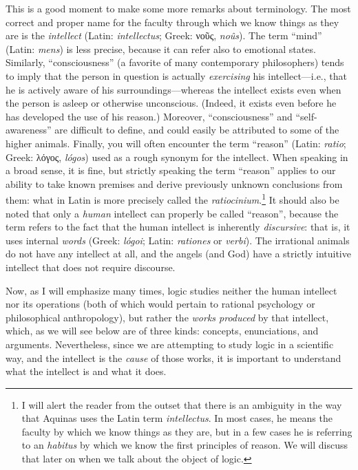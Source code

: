\documentclass[article,12pt,a4paper,oneside]{memoir}
\begin{document}
    This is a good moment to make some more remarks about terminology.
    The most correct and proper name for the faculty through which we
    know things as they are is the \emph{intellect} (Latin:
    \emph{intellectus}; Greek: νοῦς, \emph{noûs}). The term ``mind''
    (Latin: \emph{mens}) is less precise, because it can refer also to
    emotional states. Similarly, ``consciousness'' (a favorite of many
    contemporary philosophers) tends to imply that the person in
    question is actually \emph{exercising} his intellect---i.e., that he
    is actively aware of his surroundings---whereas the intellect exists
    even when the person is asleep or otherwise unconscious. (Indeed, it
    exists even before he has developed the use of his reason.)
    Moreover, ``consciousness'' and ``self-awareness'' are difficult to
    define, and could easily be attributed to some of the higher
    animals. Finally, you will often encounter the term ``reason''
    (Latin: \emph{ratio}; Greek: λόγος, \emph{lógos}) used as a rough
    synonym for the intellect. When speaking in a broad sense, it is
    fine, but strictly speaking the term ``reason'' applies to our
    ability to take known premises and derive previously unknown
    conclusions from them: what in Latin is more precisely called the
    \emph{ratiocinium}.\footnote{I will alert the reader from the outset
      that there is an ambiguity in the way that Aquinas uses the Latin
      term \emph{intellectus}. In most cases, he means the faculty by
      which we know things as they are, but in a few cases he is
      referring to an \emph{habitus} by which we know the first
      principles of reason. We will discuss that later on when we talk
      about the object of logic.} It should also be noted that only a
    \emph{human} intellect can properly be called ``reason'', because
    the term refers to the fact that the human intellect is inherently
    \emph{discursive}: that is, it uses internal \emph{words} (Greek:
    \emph{lógoi}; Latin: \emph{rationes} or \emph{verbi}). The
    irrational animals do not have any intellect at all, and the angels
    (and God) have a strictly intuitive intellect that does not require
    discourse.

    Now, as I will emphasize many times, logic studies neither the human
    intellect nor its operations (both of which would pertain to
    rational psychology or philosophical anthropology), but rather the
    \emph{works produced} by that intellect, which, as we will see below
    are of three kinds: concepts, enunciations, and arguments.
    Nevertheless, since we are attempting to study logic in a scientific
    way, and the intellect is the \emph{cause} of those works, it is
    important to understand what the intellect is and what it does.
\end{document}
